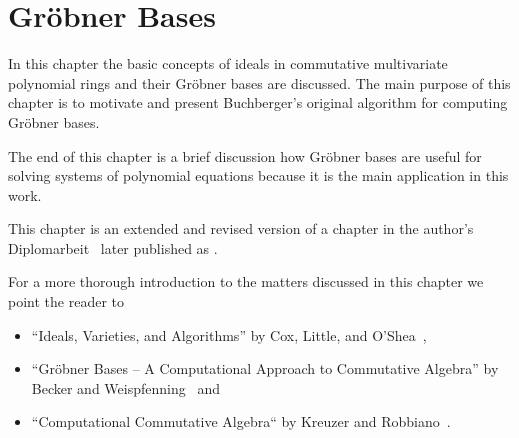 \chapter{\texorpdfstring{Gröbner}{Groebner} Bases}
\label{chapter:groebner}
In this chapter the basic concepts of ideals in commutative multivariate polynomial rings and their Gröbner bases are discussed. The main purpose of this chapter is to motivate and present Buchberger's original algorithm for computing Gröbner bases.

The end of this chapter is a brief discussion how Gröbner bases are useful for solving systems of polynomial equations because it is the main application in this work.

This chapter is an extended and revised version of a chapter in the author's Diplomarbeit~\cite{Albrecht2007} later published as \cite{albrecht:cryptologia08}. 

For a more thorough introduction to the matters discussed in this chapter we point the reader to
\begin{itemize}
\item ``Ideals, Varieties, and Algorithms'' by Cox, Little, and O'Shea~\cite{Cox2005},
\item ``Gröbner Bases -- A Computational Approach to Commutative Algebra'' by Becker and Weispfenning~\cite{Becker1991} and 
\item ``Computational Commutative Algebra`` by Kreuzer and Robbiano~\cite{Kreuzer2000}.
\end{itemize}


